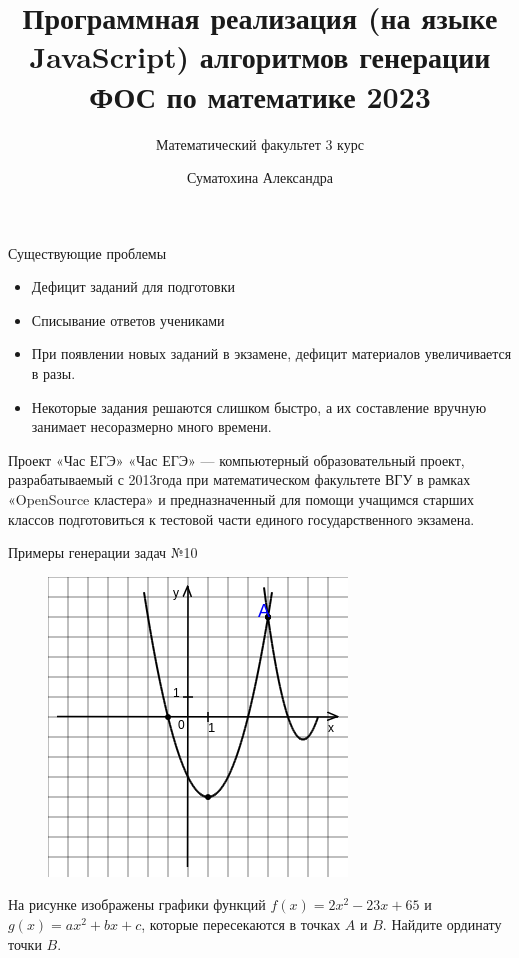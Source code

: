 \documentclass[aspectratio=169]{beamer}
\title{Программная реализация
(на языке JavaScript)
алгоритмов генерации ФОС
по математике 2023}
\subtitle{Математический факультет 3 курс}
\author{Суматохина Александра }
\date{}
\begin{document}
\maketitle

\begin{frame}{Существующие проблемы}
    \begin{itemize}
        \item Дефицит заданий для подготовки
        \item Списывание ответов учениками
        \item При появлении новых заданий в экзамене, дефицит материалов увеличивается в разы.
        \item Некоторые задания решаются слишком быстро, а их составление вручную занимает несоразмерно много времени.
    \end{itemize}
\end{frame}

\begin{frame}{Проект «Час ЕГЭ»}
    «Час ЕГЭ» — компьютерный образовательный проект, разрабатываемый с 2013года при математическом факультете ВГУ в рамках «OpenSource кластера» и предназначенный для помощи учащимся старших классов подготовиться к тестовой части единого государственного экзамена.
\end{frame}

\begin{frame}{Примеры генерации задач №10}
    \vspace{-0.5cm}
    \begin{figure}[t]
        \includegraphics[scale=0.45]{images/449724462142151n0}
    \end{figure}
    На рисунке изображены графики функций $f(x)=2x^{2}-23x+65$ и $g(x)=ax^{2} +bx+c$, которые пересекаются в точках $A$ и $B$. Найдите ординату точки $B$.
    
\end{frame}
\end{document}

